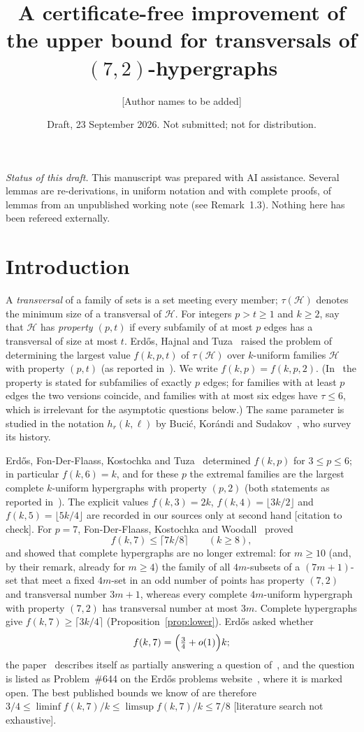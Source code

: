 \documentclass[11pt]{amsart}
\title[A certificate-free bound for $f(k,7)$]{A certificate-free improvement of the upper bound for transversals of $(7,2)$-hypergraphs}
\author{[Author names to be added]}
\date{Draft, 23 September 2026. Not submitted; not for distribution.}
\theoremstyle{definition}
\theoremstyle{remark}
\newcommand{\cH}{\mathcal H}
\newcommand{\ceil}[1]{\lceil #1\rceil}
\newcommand{\floor}[1]{\lfloor #1\rfloor}
\begin{document}
\maketitle

\noindent\textit{Status of this draft.} This manuscript was prepared with AI assistance. Several lemmas are re-derivations, in uniform notation and with complete proofs, of lemmas from an unpublished working note (see Remark~1.3). Nothing here has been refereed externally.

\section{Introduction}

A \emph{transversal} of a family of sets is a set meeting every member; $\tau(\cH)$ denotes the minimum size of a transversal of $\cH$. For integers $p>t\ge1$ and $k\ge2$, say that $\cH$ has \emph{property $(p,t)$} if every subfamily of at most $p$ edges has a transversal of size at most $t$. Erd\H{o}s, Hajnal and Tuza~\cite{EHT} raised the problem of determining the largest value $f(k,p,t)$ of $\tau(\cH)$ over $k$-uniform families $\cH$ with property $(p,t)$ (as reported in~\cite{FKW}). We write $f(k,p)=f(k,p,2)$. (In~\cite{FKW} the property is stated for subfamilies of exactly $p$ edges; for families with at least $p$ edges the two versions coincide, and families with at most six edges have $\tau\le6$, which is irrelevant for the asymptotic questions below.) The same parameter is studied in the notation $h_r(k,\ell)$ by Buci\'c, Kor\'andi and Sudakov~\cite{BKS}, who survey its history.

Erd\H{o}s, Fon-Der-Flaass, Kostochka and Tuza~\cite{EFKT} determined $f(k,p)$ for $3\le p\le6$; in particular $f(k,6)=k$, and for these $p$ the extremal families are the largest complete $k$-uniform hypergraphs with property $(p,2)$ (both statements as reported in~\cite{FKW}). The explicit values $f(k,3)=2k$, $f(k,4)=\floor{3k/2}$ and $f(k,5)=\floor{5k/4}$ are recorded in our sources only at second hand [citation to check]. For $p=7$, Fon-Der-Flaass, Kostochka and Woodall~\cite{FKW} proved
\[
f(k,7)\le\ceil{7k/8}\qquad(k\ge8),
\]
and showed that complete hypergraphs are no longer extremal: for $m\ge10$ (and, by their remark, already for $m\ge4$) the family of all $4m$-subsets of a $(7m+1)$-set that meet a fixed $4m$-set in an odd number of points has property $(7,2)$ and transversal number $3m+1$, whereas every complete $4m$-uniform hypergraph with property $(7,2)$ has transversal number at most $3m$. Complete hypergraphs give $f(k,7)\ge\ceil{3k/4}$ (Proposition~\ref{prop:lower}). Erd\H{o}s asked whether
\[
f(k,7)=\Bigl(\tfrac34+o(1)\Bigr)k ;
\]
the paper~\cite{FKW} describes itself as partially answering a question of~\cite{EFKT}, and the question is listed as Problem~\#644 on the Erd\H{o}s problems website~\cite{EP}, where it is marked open. The best published bounds we know of are therefore $3/4\le\liminf f(k,7)/k\le\limsup f(k,7)/k\le7/8$ [literature search not exhaustive].
\end{document}
